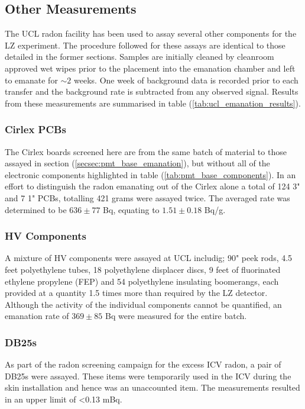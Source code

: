 \subsection{Other Measurements}
\label{secsec:other_emanation}

The UCL radon facility has been used to assay several other components for the LZ experiment. The procedure followed for these assays are identical to those detailed in the former sections. Samples are initially cleaned by cleanroom approved wet wipes prior to the placement into the emanation chamber and left to emanate for $\sim2$ weeks. One week of background data is recorded prior to each transfer and the background rate is subtracted from any observed signal. Results from these measurements are summarised in table (\ref{tab:ucl_emanation_results}).

\subsubsection{Cirlex PCBs}

The Cirlex boards screened here are from the same batch of material to those assayed in section (\ref{secsec:pmt_base_emanation}), but without all of the electronic components highlighted in table (\ref{tab:pmt_base_components}). In an effort to distinguish the radon emanating out of the Cirlex alone a total of 124 3" and 7 1" PCBs, totalling 421 grams were assayed twice. The averaged rate was determined to be $636\pm77$ \micro{}Bq, equating to $1.51\pm0.18$ \micro{}Bq/g. 

\subsubsection{HV Components}

A mixture of HV components were assayed at UCL includig; 90" peek rods, 4.5 feet polyethylene tubes, 18 polyethylene displacer discs, 9 feet of fluorinated ethylene propylene (FEP) and 54 polyethylene insulating boomerangs, each provided at a quantity 1.5 times more than required by the LZ detector. Although the activity of the individual components cannot be quantified, an emanation rate of $369\pm85$ \micro{}Bq were measured for the entire batch. 

\subsubsection{DB25s}

As part of the radon screening campaign for the excess ICV radon, a pair of DB25s were assayed. These items were temporarily used in the ICV during the skin installation and hence was an unaccounted item. The measurements resulted in an upper limit of <0.13 mBq.

